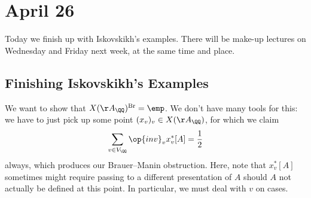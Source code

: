 \documentclass[../notes.tex]{subfiles}
\begin{document}
\section{April 26}

Today we finish up with Iskovskikh's examples. There will be make-up lectures on Wednesday and Friday next week, at the same time and place.

\subsection{Finishing Iskovskikh's Examples}
We want to show that $X(\AA_\QQ)^{\mathrm{Br}}=\emp$. We don't have many tools for this: we have to just pick up some point $(x_v)_v\in X(\AA_\QQ)$, for which we claim
\[\sum_{v\in V_\QQ}\op{inv}_vx_v^*[A]=\frac12\]
always, which produces our Brauer--Manin obstruction. Here, note that $x_v^*[A]$ sometimes might require passing to a different presentation of $A$ should $A$ not actually be defined at this point. In particular, we must deal with $v$ on cases.
\end{document}
